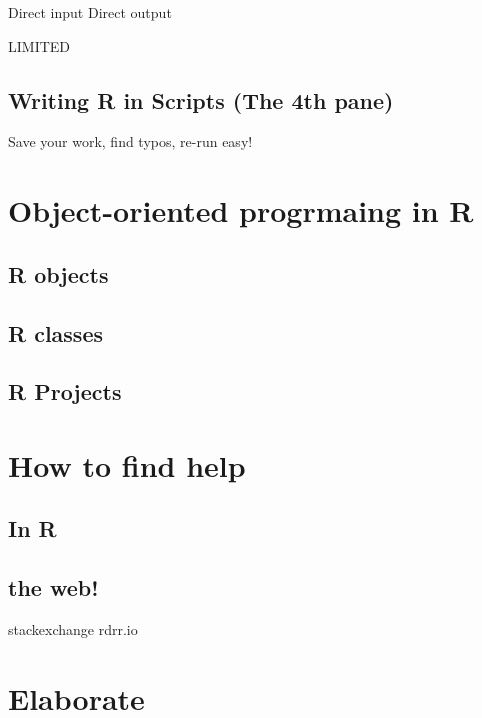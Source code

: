 \documentclass[
]{book}
\begin{document}
Direct input
Direct output

LIMITED

\hypertarget{writing-r-in-scripts-the-4th-pane}{%
\subsection{Writing R in Scripts (The 4th pane)}\label{writing-r-in-scripts-the-4th-pane}}

Save your work, find typos, re-run easy!

\hypertarget{object-oriented-progrmaing-in-r}{%
\section{Object-oriented progrmaing in R}\label{object-oriented-progrmaing-in-r}}

\hypertarget{r-objects}{%
\subsection{R objects}\label{r-objects}}

\hypertarget{r-classes}{%
\subsection{R classes}\label{r-classes}}

\hypertarget{r-projects}{%
\subsection{R Projects}\label{r-projects}}

\hypertarget{how-to-find-help}{%
\section{How to find help}\label{how-to-find-help}}

\hypertarget{in-r}{%
\subsection{In R}\label{in-r}}

\hypertarget{the-web}{%
\subsection{the web!}\label{the-web}}

stackexchange
rdrr.io

\hypertarget{elaborate-5}{%
\section{Elaborate}\label{elaborate-5}}
\end{document}
